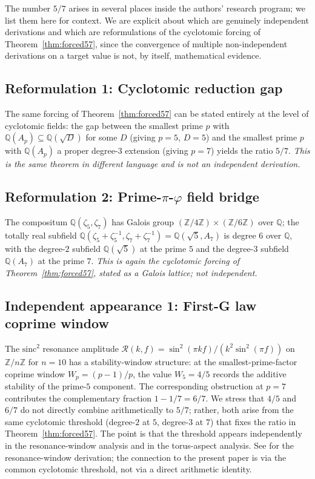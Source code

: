 \documentclass[11pt,reqno]{amsart}
\theoremstyle{plain}
\theoremstyle{definition}
\newcommand{\Z}{\mathbb{Z}}
\newcommand{\Q}{\mathbb{Q}}
\newcommand{\sinc}{\mathrm{sinc}}
\begin{document}
The number $5/7$ arises in several places inside the authors' research program; we list them here for context. We are explicit about which are genuinely independent derivations and which are reformulations of the cyclotomic forcing of Theorem~\ref{thm:forced57}, since the convergence of multiple non-independent derivations on a target value is not, by itself, mathematical evidence.

\subsection{Reformulation 1: Cyclotomic reduction gap}

The same forcing of Theorem~\ref{thm:forced57} can be stated entirely at the level of cyclotomic fields: the gap between the smallest prime $p$ with $\Q(A_{p}) \subseteq \Q(\sqrt{D})$ for some $D$ (giving $p = 5$, $D = 5$) and the smallest prime $p$ with $\Q(A_{p})$ a proper degree-$3$ extension (giving $p = 7$) yields the ratio $5/7$. \emph{This is the same theorem in different language and is not an independent derivation.}

\subsection{Reformulation 2: Prime-$\pi$-$\varphi$ field bridge}

The compositum $\Q(\zeta_5, \zeta_7)$ has Galois group $(\Z/4\Z) \times (\Z/6\Z)$ over $\Q$; the totally real subfield $\Q(\zeta_5 + \zeta_5^{-1}, \zeta_7 + \zeta_7^{-1}) = \Q(\sqrt{5}, A_7)$ is degree $6$ over $\Q$, with the degree-$2$ subfield $\Q(\sqrt 5)$ at the prime $5$ and the degree-$3$ subfield $\Q(A_7)$ at the prime $7$. \emph{This is again the cyclotomic forcing of Theorem~\ref{thm:forced57}, stated as a Galois lattice; not independent.}

\subsection{Independent appearance 1: First-G law coprime window} \label{ssec:firstG}

The $\sinc^2$ resonance amplitude $\mathcal{R}(k,f) = \sin^2(\pi k f)/(k^2 \sin^2(\pi f))$ on $\Z/n\Z$ for $n = 10$ has a stability-window structure: at the smallest-prime-factor coprime window $W_p = (p-1)/p$, the value $W_5 = 4/5$ records the additive stability of the prime-$5$ component. The corresponding obstruction at $p = 7$ contributes the complementary fraction $1 - 1/7 = 6/7$. We stress that $4/5$ and $6/7$ do not directly combine arithmetically to $5/7$; rather, both arise from the same cyclotomic threshold (degree-$2$ at $5$, degree-$3$ at $7$) that fixes the ratio in Theorem~\ref{thm:forced57}. The point is that the threshold appears independently in the resonance-window analysis and in the torus-aspect analysis. See \cite{SandersGish-FirstG} for the resonance-window derivation; the connection to the present paper is via the common cyclotomic threshold, not via a direct arithmetic identity.
\end{document}
